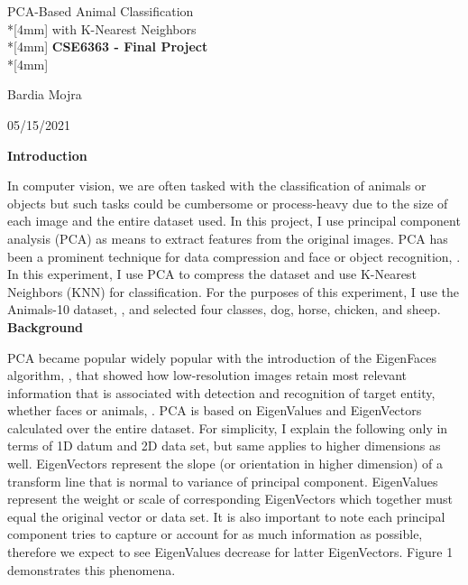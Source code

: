 \documentclass{proposalnsf}
\begin{document}
\begin{center}

{\Large{PCA-Based Animal Classification}\\*[4mm]
{with K-Nearest Neighbors}}\\*[4mm]
{\bf CSE6363 - Final Project} \\*[4mm]

Bardia Mojra

05/15/2021

\end{center}

\noindent
{\bf Introduction}

In computer vision, we are often tasked with the classification of animals or
objects but such tasks could be cumbersome or process-heavy due to the size of
each image and the entire dataset used. In this project, I use principal component analysis (PCA) as means to extract features from the original images.
PCA has been a prominent technique for data compression and face or object
recognition, \cite{turk1991eigenfaces}. In this experiment, I use PCA to
compress the dataset and use K-Nearest Neighbors (KNN) for classification. For
the purposes of this experiment, I use the Animals-10 dataset,
\cite{Animals112:online}, and selected four classes, dog, horse, chicken, and sheep.
\ \\

\noindent
{\bf Background}

PCA became popular widely popular with the introduction of the EigenFaces
algorithm, \cite{turk1991eigenfaces}, that showed how low-resolution images
retain most relevant information that is associated with detection and
recognition of target entity, whether faces or animals, \cite{8567256}.
PCA is based on EigenValues and
EigenVectors calculated over the entire dataset. For simplicity, I explain the
following only in terms of 1D datum and 2D data set, but same applies to higher
dimensions as well. EigenVectors represent the slope
(or orientation in higher dimension) of a transform line that is normal to
variance of principal component. EigenValues represent the weight or scale of
corresponding EigenVectors which together must equal the original vector or data
set. It is also important to note each principal component tries to capture or
account for as much information as possible, therefore we expect to see
EigenValues decrease for latter EigenVectors. Figure 1 demonstrates this phenomena.
\end{document}
